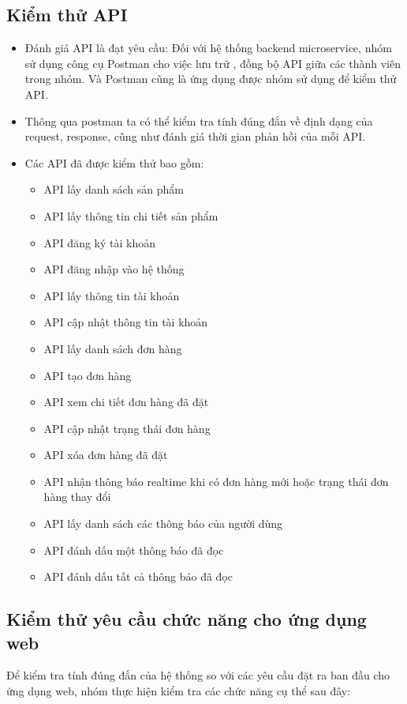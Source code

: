 \subsection{Kiểm thử API}
\begin{itemize}
  \item Đánh giá API là đạt yêu cầu: Đối với hệ thống backend microservice, nhóm sử dụng công cụ Postman cho việc lưu trữ
, đồng bộ API giữa các thành viên trong nhóm. Và Postman cũng là ứng dụng được nhóm sử dụng để kiểm thử API.
  \item Thông qua postman ta có thể kiểm tra tính đúng đắn về định dạng của request, response, cũng
  như đánh giá thời gian phản hồi của mỗi API.
  \item Các API đã được kiểm thử bao gồm:
    \begin{itemize}
      \item API lấy danh sách sản phẩm
      \item API lấy thông tin chi tiết sản phẩm
      \item API đăng ký tài khoản
      \item API đăng nhập vào hệ thống
      \item API lấy thông tin tài khoản
      \item API cập nhật thông tin tài khoản
      \item API lấy danh sách đơn hàng
      \item API tạo đơn hàng
      \item API xem chi tiết đơn hàng đã đặt
      \item API cập nhật trạng thái đơn hàng
      \item API xóa đơn hàng đã đặt
      \item API nhận thông báo realtime khi có đơn hàng mới hoặc trạng thái đơn hàng thay đổi
      \item API lấy danh sách các thông báo của người dùng
      \item API đánh dấu một thông báo đã đọc
      \item API đánh dấu tất cả thông báo đã đọc
    \end{itemize}
\end{itemize}
\subsection{Kiểm thử yêu cầu chức năng cho ứng dụng web}
Để kiểm tra tính đúng đắn của hệ thống so với các yêu cầu đặt ra ban đầu cho ứng dụng web, nhóm
thực hiện kiểm tra các chức năng cụ thể sau đây:

